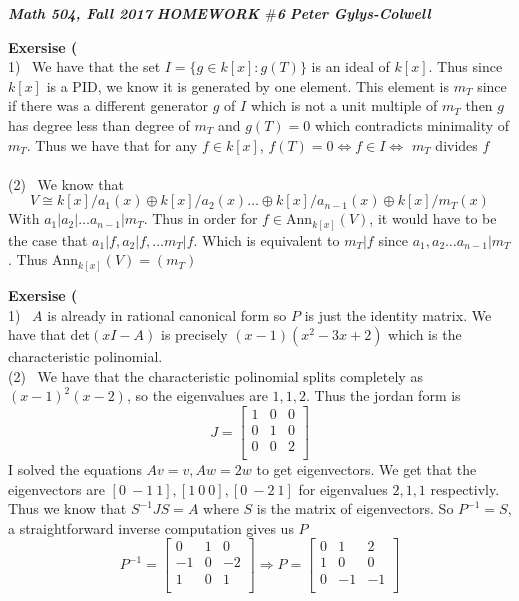 \documentclass[12pt]{article}
\newenvironment{ques}[1]{\textbf{Exersise #1}\vspace{1 mm}\\ }{\bigskip}
\theoremstyle{definition}
\newcommand{\Ann}{\text{Ann}}
\begin{document}
\noindent \textit{\textbf{Math 504, Fall 2017}} \hspace{1.3cm}
\textit{\textbf{HOMEWORK $\#$6}} \hspace{1.3cm} \textit{\textbf{Peter
Gylys-Colwell}} 

\vspace{1cm}

\begin{ques}{7.1}
	(1) \ We have that the set $I = \{g \in k[x]: g(T)\}$ is an ideal of $k[x]$.
	Thus since $k[x]$ is a PID, we know it is generated by one element. This
	element is $m_T$ since if there was a different generator $g$ of $I$ which
	is not a unit multiple of $m_T$ then $g$ has degree less than degree of
	$m_T$ and $g(T) = 0$ which contradicts minimality of $m_T$. Thus we have
	that for any $f \in k[x]$, $f(T) = 0 \Leftrightarrow f \in I
	\Leftrightarrow$ $m_T$ divides $f$\\
	\\
	(2) \ We know that 
	$$V \cong k[x]/a_1(x) \oplus k[x]/a_2(x) \dots \oplus k[x]/a_{n-1}(x)
	\oplus k[x]/m_T(x)$$
	With $a_1|a_2| \dots a_{n-1} | m_T$. Thus in order for $f \in
	\Ann_{k[x]}(V)$, it would have to be the case that $a_1 | f, a_2 | f, \dots
	m_T | f$. Which is equivalent to $m_T | f$ since $a_1, a_2 \dots a_{n-1} |
	m_T$. Thus $\Ann_{k[x]}(V) = (m_T)$
\end{ques}

\begin{ques}{7.2}
	(1) \ $A$ is already in rational canonical form so $P$ is just the identity
	matrix. We have that det$(xI - A)$ is precisely $(x - 1)(x^2 - 3x + 2)$
	which is the characteristic polinomial.\\
	(2) \ We have that the characteristic polinomial splits completely as $(x -
	1)^2(x - 2)$, so the eigenvalues are $1, 1, 2$. Thus the jordan form is
	$$J = \begin{bmatrix}
	1 & 0 & 0\\
	0 & 1 & 0\\
	0 & 0 & 2\\
	\end{bmatrix}$$
	I solved the equations $Av = v, Aw = 2w$ to get eigenvectors. We
	get that the eigenvectors are $[0\ -1\ 1], [1\ 0\ 0], [0\ -2\ 1]$ for
	eigenvalues $2, 1, 1$ respectivly. Thus we know that $S^{-1}JS = A$ where
	$S$ is the matrix of eigenvectors. So $P^{-1} = S$, a straightforward
	inverse computation gives us $P$
	$$P^{-1} = \begin{bmatrix}
	0 & 1 & 0\\
	-1 & 0 & -2\\
	1 & 0 & 1\\
	\end{bmatrix} \Rightarrow
	P = \begin{bmatrix}
	0 & 1 & 2\\
	1 & 0 & 0\\
	0 & -1 & -1\\
	\end{bmatrix}
	$$
\end{ques}
\end{document}
